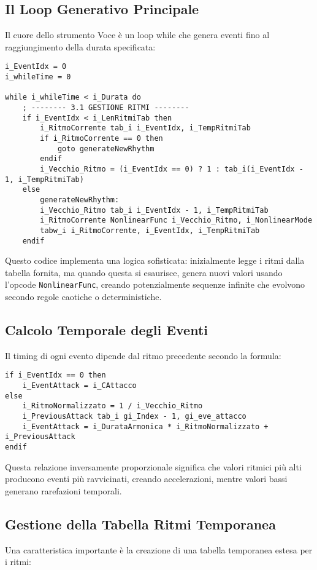 \subsection{Il Loop Generativo Principale}
Il cuore dello strumento Voce è un loop while che genera eventi fino al raggiungimento della durata specificata:

\begin{lstlisting}[language=Csound]
i_EventIdx = 0
i_whileTime = 0

while i_whileTime < i_Durata do
    ; -------- 3.1 GESTIONE RITMI --------
    if i_EventIdx < i_LenRitmiTab then
        i_RitmoCorrente tab_i i_EventIdx, i_TempRitmiTab
        if i_RitmoCorrente == 0 then
            goto generateNewRhythm
        endif
        i_Vecchio_Ritmo = (i_EventIdx == 0) ? 1 : tab_i(i_EventIdx - 1, i_TempRitmiTab)
    else
        generateNewRhythm:
        i_Vecchio_Ritmo tab_i i_EventIdx - 1, i_TempRitmiTab
        i_RitmoCorrente NonlinearFunc i_Vecchio_Ritmo, i_NonlinearMode
        tabw_i i_RitmoCorrente, i_EventIdx, i_TempRitmiTab
    endif
\end{lstlisting}

Questo codice implementa una logica sofisticata: inizialmente legge i ritmi dalla tabella fornita, ma quando questa si esaurisce, genera nuovi valori usando l'opcode \texttt{NonlinearFunc}, creando potenzialmente sequenze infinite che evolvono secondo regole caotiche o deterministiche.
\subsection{Calcolo Temporale degli Eventi}
Il timing di ogni evento dipende dal ritmo precedente secondo la formula:

\begin{lstlisting}[language=Csound]
if i_EventIdx == 0 then
    i_EventAttack = i_CAttacco
else
    i_RitmoNormalizzato = 1 / i_Vecchio_Ritmo
    i_PreviousAttack tab_i gi_Index - 1, gi_eve_attacco
    i_EventAttack = i_DurataArmonica * i_RitmoNormalizzato + i_PreviousAttack
endif
\end{lstlisting}

Questa relazione inversamente proporzionale significa che valori ritmici più alti producono eventi più ravvicinati, creando accelerazioni, mentre valori bassi generano rarefazioni temporali.
\subsection{Gestione della Tabella Ritmi Temporanea}
Una caratteristica importante è la creazione di una tabella temporanea estesa per i ritmi:

